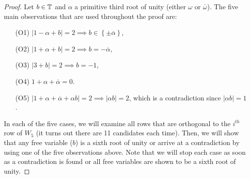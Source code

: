 \begin{lemma}
\begin{proof}
  Let $b \in \mathbb{T}$ and $\alpha$ a primitive third root of unity (either $\omega$ or $\bar\omega$). The five main observations that are used throughout the proof are:
\begin{enumerate}
 \item[(O1)] $|1-\alpha+b|=2 \implies b\in\left\{\pm\overline{\alpha}\right\}$,
 \item[(O2)] $|1+\alpha+b|=2 \implies b=-\overline{\alpha}$,
 \item[(O3)] $|3+b|=2 \implies b=-1$,
 \item[(O4)] $1+\alpha+\overline{\alpha}=0$.
 \item[(O5)] $|1+\alpha+\overline\alpha+\alpha b|=2 \implies |\alpha b| = 2$, which is a contradiction since $|\alpha b| = 1$.
\end{enumerate}

\newcommand{\unb}[2]{|\langle R_{#1},r_{#2}\rangle|=2}

In each of the five cases, we will examine all rows that are orthogonal to the $i^{th}$ row of $W_5$ (it turns out there are 11 candidates each time). Then, we will show that any free variable ($b$) is a sixth root of unity or arrive at a contradiction by using one of the five observations above. Note that we will stop each case as soon as a contradiction is found or all free variables are shown to be a sixth root of unity.


\end{proof}
\end{lemma}
